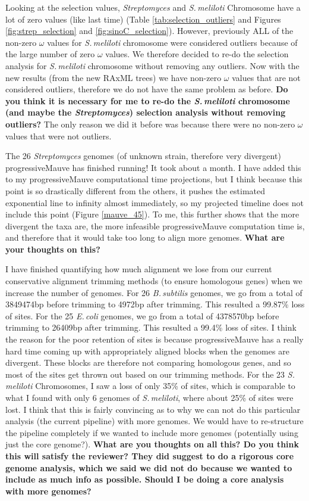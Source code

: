 \documentclass[12pt]{article}
\newcommand{\smel}{\textit{S.\,meliloti}\xspace}
\newcommand{\p}{progressiveMauve\xspace}
\newcommand{\strep}{\textit{Streptomyces}\xspace}
\newcommand{\bass}{\textit{B.\,subtilis}\xspace}
\newcommand{\ecol}{\textit{E.\,coli}\xspace}
\begin{document}
Looking at the selection values, \strep and \smel Chromosome have a lot of zero values (like last time) (Table \ref{tab:selection_outliers} and Figures \ref{fig:strep_selection} and \ref{fig:sinoC_selection}).
However, previously ALL of the non-zero $\omega$ values for \smel chromosome were considered outliers because of the large number of zero $\omega$ values.
We therefore decided to re-do the selection analysis for \smel chromosome without removing any outliers.
Now with the new results (from the new RAxML trees) we have non-zero $\omega$ values that are not considered outliers, therefore we do not have the same problem as before.
\textbf{Do you think it is necessary for me to re-do the \smel chromosome (and maybe the \strep) selection analysis without removing outliers?} The only reason we did it before was because there were no non-zero $\omega$ values that were not outliers.










The 26 \strep genomes (of unknown strain, therefore very divergent) \p has finished running! It took about a month.
I have added this to my \p computational time projections, but I think because this point is so drastically different from the others, it pushes the estimated exponential line to infinity almost immediately, so my projected timeline does not include this point (Figure \ref{mauve_45}).
To me, this further shows that the more divergent the taxa are, the more infeasible \p computation time is, and therefore that it would take too long to align more genomes.
\textbf{What are your thoughts on this?} 

I have finished quantifying how much alignment we lose from our current conservative alignment trimming methods (to ensure homologous genes) when we increase the number of genomes.
For 26 \bass genomes, we go from a total of 3849474bp before trimming to 4972bp after trimming.
This resulted a 99.87\% loss of sites.
For the 25 \ecol genomes, we go from a total of 4378570bp before trimming to 26409bp after trimming.
This resulted a 99.4\% loss of sites.
I think the reason for the poor retention of sites is because \p has a really hard time coming up with appropriately aligned blocks when the genomes are divergent.
These blocks are therefore not comparing homologous genes, and so most of the sites get thrown out based on our trimming methods.
For the 23 \smel Chromosomes, I saw a loss of only 35\% of sites, which is comparable to what I found with only 6 genomes of \smel, where about 25\% of sites were lost.
I think that this is fairly convincing as to why we can not do this particular analysis (the current pipeline) with more genomes.
We would have to re-structure the pipeline completely if we wanted to include more genomes (potentially using just the core genome?).
\textbf{What are you thoughts on all this? Do you think this will satisfy the reviewer? They did suggest to do a rigorous core genome analysis, which we said we did not do because we wanted to include as much info as possible. Should I be doing a core analysis with more genomes?}
\end{document}
